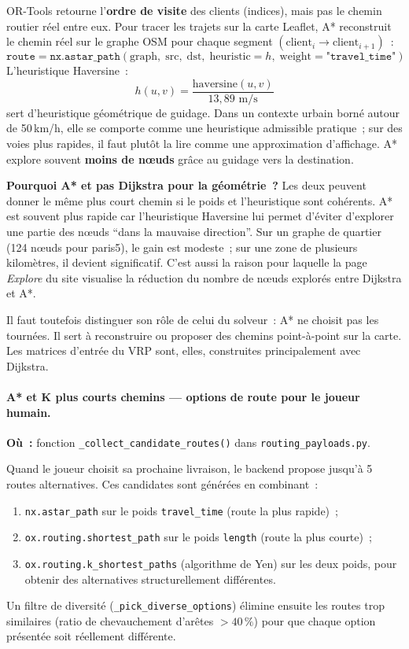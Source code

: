 \documentclass[a4paper, 12pt, twoside]{article}
\begin{document}
OR-Tools retourne l'\textbf{ordre de visite} des clients (indices), mais pas le chemin routier
r\'{e}el entre eux. Pour tracer les trajets sur la carte Leaflet, A* reconstruit le chemin
r\'{e}el sur le graphe OSM pour chaque segment $(\text{client}_i \rightarrow \text{client}_{i+1})$~:
\[
  \texttt{route} = \texttt{nx.astar\_path}(\text{graph},\; \text{src},\; \text{dst},\;
  \text{heuristic}=h,\; \text{weight}=\texttt{"travel\_time"})
\]
L'heuristique Haversine~:
\[
  h(u, v) = \frac{\text{haversine}(u, v)}{13{,}89 \text{ m/s}}
\]
sert d'heuristique g\'{e}om\'{e}trique de guidage. Dans un contexte urbain born\'{e} autour
de 50\,km/h, elle se comporte comme une heuristique admissible pratique~; sur des voies
plus rapides, il faut plut\^{o}t la lire comme une approximation d'affichage. A* explore
souvent \textbf{moins de n\oe uds} gr\^{a}ce au guidage vers la destination.

\textbf{Pourquoi A* et pas Dijkstra pour la g\'{e}om\'{e}trie~?}
Les deux peuvent donner le m\^{e}me plus court chemin si le poids et l'heuristique sont
coh\'{e}rents.
A* est souvent plus rapide car l'heuristique Haversine lui permet d'\'{e}viter d'explorer
une partie des n\oe uds ``dans la mauvaise direction''.
Sur un graphe de quartier (124 n\oe uds pour paris5), le gain est modeste~; sur une
zone de plusieurs kilom\`{e}tres, il devient significatif. C'est aussi la raison pour
laquelle la page \textit{Explore} du site visualise la r\'{e}duction du nombre de n\oe uds
explor\'{e}s entre Dijkstra et A*.

Il faut toutefois distinguer son r\^{o}le de celui du solveur~: A* ne choisit pas les
tourn\'{e}es. Il sert \`{a} reconstruire ou proposer des chemins point-\`{a}-point sur la
carte. Les matrices d'entr\'{e}e du VRP sont, elles, construites principalement avec
Dijkstra.

\paragraph{A* et K plus courts chemins --- options de route pour le joueur humain.}

\textbf{O\`{u}~:} fonction \texttt{\_collect\_candidate\_routes()} dans \texttt{routing\_payloads.py}.

Quand le joueur choisit sa prochaine livraison, le backend propose jusqu'\`{a} 5 routes
alternatives. Ces candidates sont g\'{e}n\'{e}r\'{e}es en combinant~:
\begin{enumerate}
  \item \texttt{nx.astar\_path} sur le poids \texttt{travel\_time} (route la plus rapide)~;
  \item \texttt{ox.routing.shortest\_path} sur le poids \texttt{length} (route la plus courte)~;
  \item \texttt{ox.routing.k\_shortest\_paths} (algorithme de Yen) sur les deux poids,
        pour obtenir des alternatives structurellement diff\'{e}rentes.
\end{enumerate}
Un filtre de diversit\'{e} (\texttt{\_pick\_diverse\_options}) \'{e}limine ensuite les routes
trop similaires (ratio de chevauchement d'ar\^{e}tes $> 40\,\%$) pour que chaque option
pr\'{e}sent\'{e}e soit r\'{e}ellement diff\'{e}rente.
\end{document}
